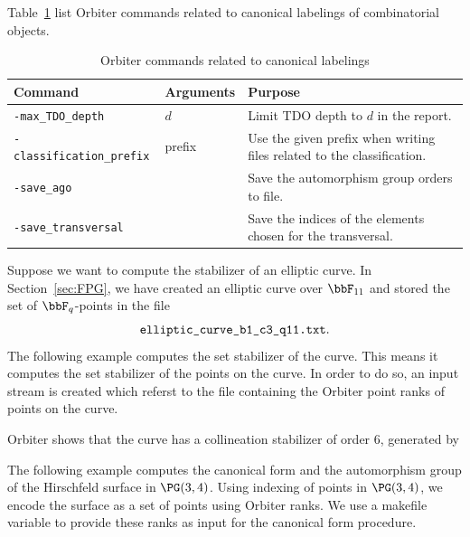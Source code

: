 \bigskip


Table~\ref{tab:canonical} list Orbiter commands related 
to canonical labelings of combinatorial objects.
\begin{table}
\begin{center}
\begin{tabular}{|p{5cm}|p{2cm}|p{7cm}|}
\hline
Command & Arguments & Purpose \\
\hline 
\verb'-max_TDO_depth' & $d$  & Limit TDO depth to $d$ in the report.\\
\hline
\verb'-classification_prefix' & prefix  & Use the given prefix when writing files related to the classification.\\
\hline
\verb'-save_ago' &   & Save the automorphism group orders to file.\\
\hline
\verb'-save_transversal' &   & Save the indices of the elements chosen for the transversal.\\
\hline
\end{tabular}
\end{center}
\caption{\label{tab:canonical}Orbiter commands related to canonical labelings}
\end{table}

\bigskip




Suppose we want to compute the stabilizer of an elliptic curve.
In Section~\ref{sec:FPG}, we have created an elliptic curve over $\bbF_{11}$ 
and stored the set of $\bbF_q$-points in the file 
$$
\verb'elliptic_curve_b1_c3_q11.txt'.
$$
The following example computes the set stabilizer of the curve.
This means it computes the set stabilizer of the points on the curve. 
In order to do so, an input stream is created which referst to the file 
containing the Orbiter point ranks of points on the curve. 
{\tt

}
Orbiter shows that the curve has a collineation stabilizer of order 6, 
generated by 
\begin{mdframed}[style=MyFrame]

\end{mdframed}

\bigskip

The following example computes the canonical form 
and the automorphism group of the Hirschfeld surface in $\PG(3,4)$. 
Using indexing of points in $\PG(3,4)$, we encode the 
surface as a set of points using Orbiter ranks.
We use a makefile variable to provide these ranks as input for the canonical form procedure.
{\tt

}
{\tt

}
{\tt

}

